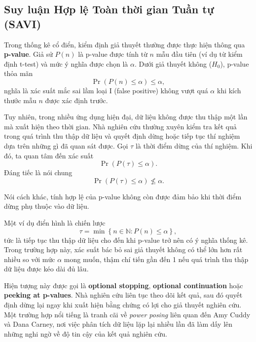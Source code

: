 \subsection{Suy luận Hợp lệ Toàn thời gian Tuần tự (SAVI)}

Trong thống kê cổ điển, kiểm định giả thuyết thường được thực hiện thông qua
\textbf{p-value}. Giả sử $P(n)$ là p-value được tính từ $n$ mẫu đầu tiên
(ví dụ từ kiểm định t-test) và mức ý nghĩa được chọn là $\alpha$.
Dưới giả thuyết không ($H_0$), p-value thỏa mãn
\begin{equation}
\Pr(P(n)\leq \alpha)\leq \alpha,
\end{equation}
nghĩa là xác suất mắc sai lầm loại I (false positive) không vượt quá $\alpha$
khi kích thước mẫu $n$ được xác định trước.

Tuy nhiên, trong nhiều ứng dụng hiện đại, dữ liệu không được thu thập một lần mà xuất hiện theo thời gian. Nhà nghiên cứu thường xuyên kiểm tra kết quả trong quá trình thu thập dữ liệu và quyết định dừng hoặc tiếp tục thí nghiệm dựa trên những gì đã quan sát được. Gọi $\tau$ là thời điểm dừng của thí nghiệm. Khi đó, ta quan tâm đến xác suất
\begin{equation}
\Pr(P(\tau)\leq \alpha).
\end{equation} Đáng tiếc là nói chung
\begin{equation}
\Pr(P(\tau)\leq \alpha)\nleq \alpha.
\end{equation}

Nói cách khác, tính hợp lệ của p-value không còn được đảm bảo khi thời điểm dừng phụ thuộc vào dữ liệu.

Một ví dụ điển hình là chiến lược
\begin{equation}
\tau
=
\min
\left\{
n\in\mathbb{N}:P(n)\leq \alpha
\right\},
\end{equation}
tức là tiếp tục thu thập dữ liệu cho đến khi p-value trở nên có ý nghĩa thống kê. Trong trường hợp này, xác suất bác bỏ sai giả thuyết không có thể lớn hơn rất nhiều so với mức $\alpha$ mong muốn, thậm chí tiến gần đến 1 nếu quá trình thu thập dữ liệu được kéo dài đủ lâu.

Hiện tượng này được gọi là \textbf{optional stopping},
\textbf{optional continuation} hoặc \textbf{peeking at p-values}.
Nhà nghiên cứu liên tục theo dõi kết quả, sau đó quyết định dừng lại ngay khi xuất hiện bằng chứng có lợi cho giả thuyết nghiên cứu. Một trường hợp nổi tiếng là tranh cãi về \textit{power posing} liên quan đến Amy Cuddy và Dana Carney, nơi việc phân tích dữ liệu lặp lại nhiều lần đã làm dấy lên những nghi ngờ về độ tin cậy của kết quả nghiên cứu.

